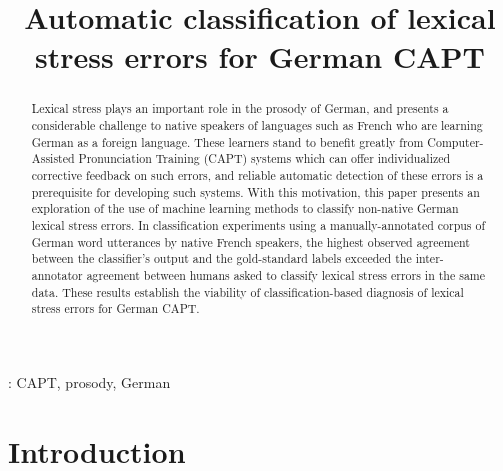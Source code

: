 \documentclass[a4paper]{article}
\title{Automatic classification of lexical stress errors for German CAPT}
\newcommand{\TODO}[1]{{\color{red}\textbf{[TODO #1]}}}
\begin{document}
  \maketitle
  \begin{abstract}
  	Lexical stress plays an important role in the prosody of German, and presents a considerable challenge to native speakers of languages such as French who are learning German as a foreign language. These learners stand to benefit greatly from Computer-Assisted Pronunciation Training (CAPT) systems which can offer individualized corrective feedback on such errors, and reliable automatic detection of these errors is a prerequisite for developing such systems. With this motivation, this paper presents 
  	an exploration of the use of machine learning methods to classify non-native German lexical stress errors. 
  	In classification experiments using a manually-annotated corpus of German word utterances by native French speakers,
  	the highest observed agreement between the classifier's output and the gold-standard labels 
  	exceeded the inter-annotator agreement between humans asked to classify lexical stress errors in the same data. 
  	These results establish
  	the viability of 
  	classification-based diagnosis of lexical stress errors 
  	for German CAPT.
  \end{abstract}
  : CAPT, prosody, German %


  \section{Introduction}
  
  
    
  
\end{document}
